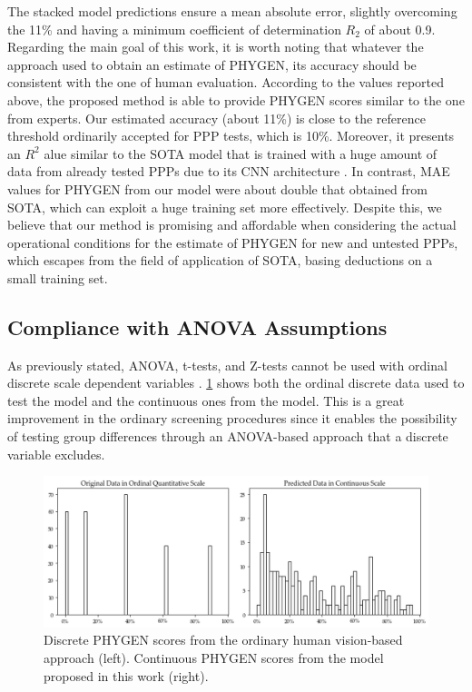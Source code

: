 \documentclass[12pt,a4paper,oneside]{report}
\begin{document}
The stacked model predictions ensure a mean absolute error, slightly overcoming the 11\% and having a minimum coefficient of determination
$R_2$ of about 0.9.
Regarding the main goal of this work, it is worth noting that whatever the approach used to obtain an estimate of PHYGEN, its accuracy should be consistent with the one of human evaluation. According to the values reported above, the proposed method is able to provide PHYGEN scores similar to the one from experts. Our estimated accuracy (about 11\%) is close to the reference threshold ordinarily accepted for PPP tests, which is 10\%. Moreover, it presents an 
$R^2$ alue similar to the SOTA model that is trained with a huge amount of data from already tested PPPs due to its CNN architecture
\cite{gomez-zamanilloDamageAssessmentSoybean2023}.
In contrast, MAE values for PHYGEN from our model were about double that obtained from SOTA, which can exploit a huge training set more effectively.
Despite this, we believe that our method is promising and affordable when considering the actual operational conditions for the estimate of PHYGEN for new and untested PPPs, which escapes from the field of application of SOTA, basing deductions on a small training set.

\subsection{Compliance with ANOVA Assumptions}

As previously stated, ANOVA, t-tests, and Z-tests cannot be used with ordinal discrete scale dependent variables 
\cite{stevensTheoryScalesMeasurement1946}.
\cref{fig:ordinal_continuous} shows both the ordinal discrete data used to test the model and the continuous ones from the model. This is a great improvement in the ordinary screening procedures since it enables the possibility of testing group differences through an ANOVA-based approach that a discrete variable excludes.

\begin{figure}[H]
    \centering
    \includegraphics[width=\textwidth]{Images/agronomy-14-00306-g008}
    \caption{Discrete PHYGEN scores from the ordinary human vision-based approach (left). Continuous PHYGEN scores from the model proposed in this work (right).}
    \label{fig:ordinal_continuous}
\end{figure}
\end{document}
